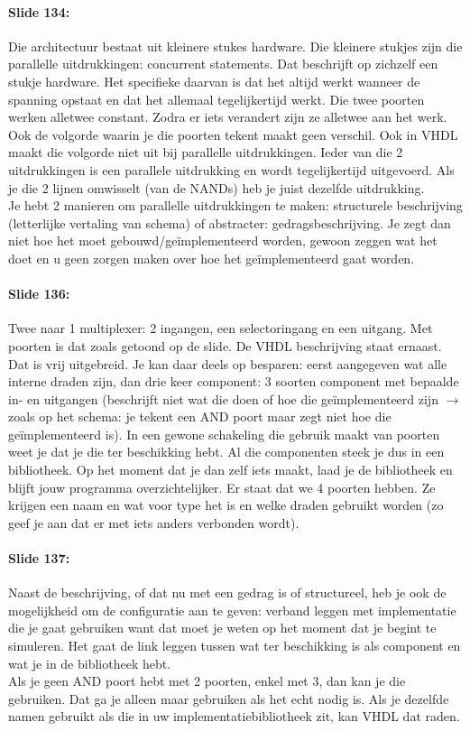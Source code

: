 \documentclass[10pt,a4paper]{book}
\begin{document}
\paragraph{Slide 134:} Die architectuur bestaat uit kleinere stukes hardware. Die kleinere stukjes zijn die parallelle uitdrukkingen: concurrent statements. Dat beschrijft op zichzelf een stukje hardware. Het specifieke daarvan is dat het altijd werkt wanneer de spanning opstaat en dat het allemaal tegelijkertijd werkt. Die twee poorten werken alletwee constant. Zodra er iets verandert zijn ze alletwee aan het werk. Ook de volgorde waarin je die poorten tekent maakt geen verschil. Ook in VHDL maakt die volgorde niet uit bij parallelle uitdrukkingen. Ieder van die 2 uitdrukkingen is een parallele uitdrukking en wordt tegelijkertijd uitgevoerd. Als je die 2 lijnen omwisselt (van de NANDs) heb je juist dezelfde uitdrukking.\\
Je hebt 2 manieren om parallelle uitdrukkingen te maken: structurele beschrijving (letterlijke vertaling van schema) of abstracter: gedragsbeschrijving. Je zegt dan niet hoe het moet gebouwd/ge\"implementeerd worden, gewoon zeggen wat het doet en u geen zorgen maken over hoe het ge\"implementeerd gaat worden. 

\paragraph{Slide 136:} Twee naar 1 multiplexer: 2 ingangen, een selectoringang en een uitgang. Met poorten is dat zoals getoond op de slide. De VHDL beschrijving staat ernaast. Dat is vrij uitgebreid. Je kan daar deels op besparen: eerst aangegeven wat alle interne draden zijn, dan drie keer component: 3 soorten component met bepaalde in- en uitgangen (beschrijft niet wat die doen of hoe die ge\"implementeerd zijn $\rightarrow$ zoals op het schema: je tekent een AND poort maar zegt niet hoe die ge\"implementeerd is). In een gewone schakeling die gebruik maakt van poorten weet je dat je die ter beschikking hebt. Al die componenten steek je dus in een bibliotheek. Op het moment dat je dan zelf iets maakt, laad je de bibliotheek en blijft jouw programma overzichtelijker. Er staat dat we 4 poorten hebben. Ze krijgen een naam en wat voor type het is en welke draden gebruikt worden (zo geef je aan dat er met iets anders verbonden wordt). 

\paragraph{Slide 137:} Naast de beschrijving, of dat nu met een gedrag is of structureel, heb je ook de mogelijkheid om de configuratie aan te geven: verband leggen met implementatie die je gaat gebruiken want dat moet je weten op het moment dat je begint te simuleren. Het gaat de link leggen tussen wat ter beschikking is als component en wat je in de bibliotheek hebt.\\
Als je geen AND poort hebt met 2 poorten, enkel met 3, dan kan je die gebruiken. Dat ga je alleen maar gebruiken als het echt nodig is. Als je dezelfde namen gebruikt als die in uw implementatiebibliotheek zit, kan VHDL dat raden.
\end{document}
